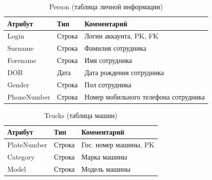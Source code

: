 \begin{table}[h] 
	\begin{center}
		\caption{Person (таблица личной информации)}
		\label{pers_table}
		\begin{tabular}{| p{3.8cm} | p{3cm} | p{7.2cm} |}
			\hline
			\textbf{Атрибут}		&	\textbf{Тип}		& \textbf{Комментарий} \\
			\hline
			Login 		&	Строка		&	Логин аккаунта, PK, FK \\ \hline
			Surname 	&	Строка 		&	Фамилия сотрудника \\ \hline
			Forename 	&	Строка 		&	Имя сотрудника \\ \hline
			DOB 		&	Дата		&	Дата рождения сотрудника \\ \hline
			Gender 		&   Строка		&	Пол сотрудника \\ \hline
			PhoneNumber	&   Строка		&	Номер мобильного телефона сотрудника \\ \hline
		\end{tabular}
	\end{center}
\end{table}

\begin{table}[h!] 
	\begin{center}
		\caption{Trucks (таблица машин)}
		\label{truck_table}
		\begin{tabular}{| p{3.8cm} | p{3cm} | p{7.2cm} |}
			\hline
			\textbf{Атрибут}		&	\textbf{Тип}		& \textbf{Комментарий} \\
			\hline
			PlateNumber	&	Строка	&	Гос. номер машины, PK \\ \hline
			Category	&	Строка	&	Марка машины \\ \hline
			Model		&	Строка	&	Модель машины \\ \hline
		\end{tabular}
	\end{center}
\end{table}

